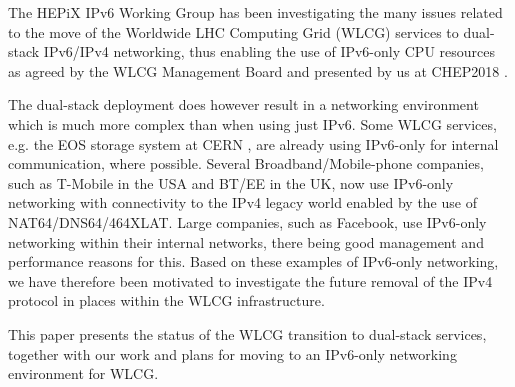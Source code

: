 

 


The HEPiX IPv6 Working Group \cite{ipv6wg} has been investigating the many issues related to the 
move of the Worldwide LHC Computing Grid (WLCG) services to dual-stack IPv6/IPv4 networking, thus enabling the use of
IPv6-only CPU resources as agreed by the WLCG Management Board and presented by us at 
CHEP2018 \cite{ipv6chep2018}. 

The dual-stack deployment does however result in a networking environment
which is much more complex than when using just IPv6. Some WLCG services, e.g.
the EOS storage system at CERN \cite{eos}, are already using IPv6-only for internal communication,
where possible. Several Broadband/Mobile-phone companies, such as T-Mobile in the USA and
BT/EE in the UK, now use IPv6-only networking with connectivity to the IPv4
legacy world enabled by the use of NAT64/DNS64/464XLAT. Large companies, such
as Facebook, use IPv6-only networking within their internal networks, there
being good management and performance reasons for this. Based on these examples
of IPv6-only networking, we have therefore been motivated to investigate the future removal of the IPv4 protocol in
places within the WLCG infrastructure.

This paper presents the status of the WLCG transition to dual-stack services, together with 
our work and plans for moving to an IPv6-only networking environment for WLCG.

